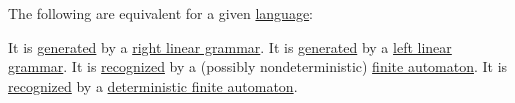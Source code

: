 \begin{proposition}\label{thm:regular_languages}
  The following are equivalent for a given \hyperref[def:formal_language/language]{language}:
  \begin{thmenum}
     It is \hyperref[def:formal_grammar/language]{generated} by a \hyperref[def:chomsky_hierarchy/regular]{right linear grammar}.
     It is \hyperref[def:formal_grammar/language]{generated} by a \hyperref[def:chomsky_hierarchy/regular]{left linear grammar}.
     It is \hyperref[def:finite_automaton/language]{recognized} by a (possibly nondeterministic) \hyperref[def:finite_automaton]{finite automaton}.
     It is \hyperref[def:finite_automaton/language]{recognized} by a \hyperref[def:finite_automaton/determinism]{deterministic finite automaton}.
  \end{thmenum}
\end{proposition}
